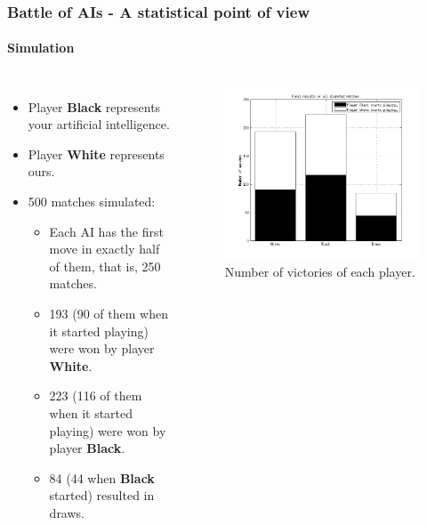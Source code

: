 \documentclass[10pt]{beamer}
\begin{document}
\begin{frame}
\frametitle{Battle of AIs - A statistical point of view}
\framesubtitle{Simulation}

	\begin{columns}
		
		\begin{itemize}
		  \item Player \textbf{Black} represents your artificial intelligence.
		  \item Player \textbf{White} represents ours.
		  \item 500 matches simulated: 
		
			\begin{itemize}
			  \item Each AI has the first move in exactly half of them, that is, 250 matches.
			  \item 193 (90 of them when it started playing) were won by player
			  \textbf{White}.
			  \item 223 (116  of them when it started playing) were won by player
			  \textbf{Black}.
			  \item 84 (44 when \textbf{Black} started) resulted in draws. 
			  
			\end{itemize}
	
		\end{itemize}
		
		\begin{figure}[h]
		\centering
		\includegraphics[scale=.3 ]{images/victories_count}
		\caption{\centering Number of victories of each player.}
		\label{fig:gui}
		\end{figure}

	\end{columns}
\end{frame}
\end{document}
